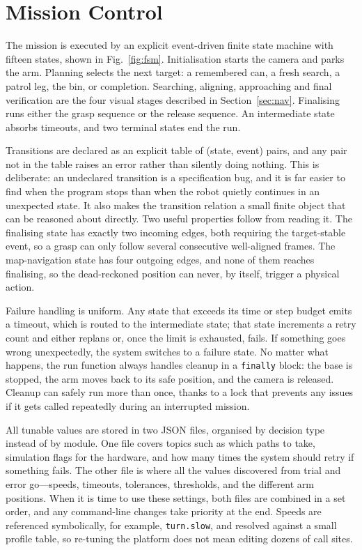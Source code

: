 \documentclass[conference,a4paper,10pt]{IEEEtran}
\begin{document}
\section{Mission Control}

The mission is executed by an explicit event-driven finite state machine
with fifteen states, shown in Fig.~\ref{fig:fsm}. Initialisation starts
the camera and parks the arm. Planning selects the next target: a
remembered can, a fresh search, a patrol leg, the bin, or completion.
Searching, aligning, approaching and final verification are the four
visual stages described in Section~\ref{sec:nav}. Finalising runs either
the grasp sequence or the release sequence. An intermediate state absorbs
timeouts, and two terminal states end the run.

Transitions are declared as an explicit table of (state, event) pairs,
and any pair not in the table raises an error rather than silently doing
nothing. This is deliberate: an undeclared transition is a specification
bug, and it is far easier to find when the program stops than when the
robot quietly continues in an unexpected state. It also makes the
transition relation a small finite object that can be reasoned about
directly. Two useful properties follow from reading it. The finalising
state has exactly two incoming edges, both requiring the target-stable
event, so a grasp can only follow several consecutive well-aligned
frames. The map-navigation state has four outgoing edges, and none of
them reaches finalising, so the dead-reckoned position can never, by
itself, trigger a physical action.

Failure handling is uniform. Any state that exceeds its time or step
budget emits a timeout, which is routed to the intermediate state; that
state increments a retry count and either replans or, once the limit is
exhausted, fails. If something goes wrong unexpectedly, the system
switches to a failure state. No matter what happens, the run function
always handles cleanup in a \texttt{finally} block: the base is stopped,
the arm moves back to its safe position, and the camera is released.
Cleanup can safely run more than once, thanks to a lock that prevents any
issues if it gets called repeatedly during an interrupted mission.

All tunable values are stored in two JSON files, organised by decision
type instead of by module. One file covers topics such as which paths to
take, simulation flags for the hardware, and how many times the system
should retry if something fails. The other file is where all the values
discovered from trial and error go---speeds, timeouts, tolerances,
thresholds, and the different arm positions. When it is time to use these
settings, both files are combined in a set order, and any command-line
changes take priority at the end. Speeds are referenced symbolically, for
example, \texttt{turn.slow}, and resolved against a small profile table,
so re-tuning the platform does not mean editing dozens of call sites.
\end{document}
